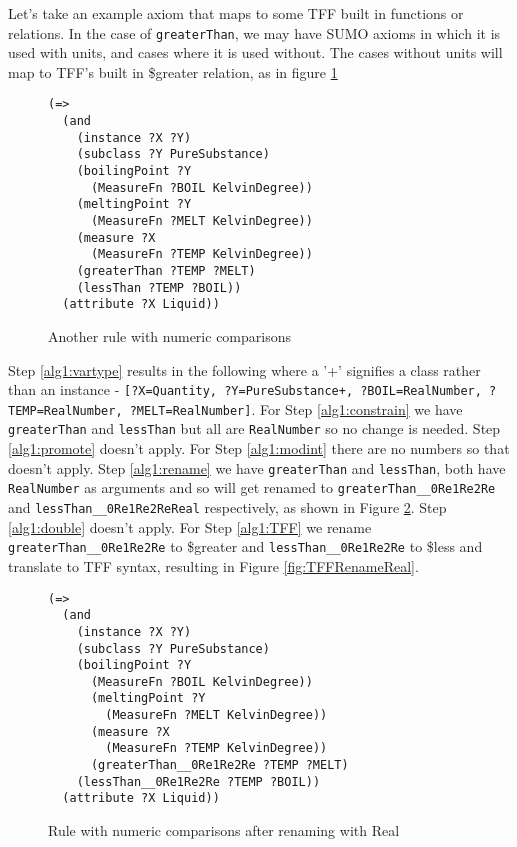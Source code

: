 \documentclass{article}
\begin{document}
Let's take an example axiom that maps to some TFF
built in functions or relations.  In the case of \texttt{greaterThan}, we may
have SUMO axioms in which it is used with units, and cases where it is used
without.  The cases without units will map to TFF's built in \$greater relation,
as in figure \ref{fig:NumCompare}

\begin{figure}[H]
\begin{framed}
\begin{verbatim}
(=>
  (and
    (instance ?X ?Y)
    (subclass ?Y PureSubstance)
    (boilingPoint ?Y
      (MeasureFn ?BOIL KelvinDegree))
    (meltingPoint ?Y
      (MeasureFn ?MELT KelvinDegree))
    (measure ?X
      (MeasureFn ?TEMP KelvinDegree))
    (greaterThan ?TEMP ?MELT)
    (lessThan ?TEMP ?BOIL))
  (attribute ?X Liquid))
\end{verbatim}
\end{framed}
\caption{Another rule with numeric comparisons}
\label{fig:NumCompare}
\end{figure}

\begin{sloppypar} Step \ref{alg1:vartype} results in the following where a '+'
signifies a class rather than an instance - \texttt{[?X=Quantity,
?Y=PureSubstance+, ?BOIL=RealNumber, ?TEMP=RealNumber, ?MELT=RealNumber]}. For
Step \ref{alg1:constrain} we have \texttt{greaterThan} and \texttt{lessThan} but
all are \texttt{RealNumber} so no change is needed. Step \ref{alg1:promote}
doesn't apply. For Step \ref{alg1:modint} there are no numbers so that doesn't
apply.   Step \ref{alg1:rename} we have \texttt{greaterThan} and
\texttt{lessThan}, both have \texttt{RealNumber} as arguments and so will get
renamed to \texttt{greaterThan\_\_0Re1Re2Re} and \texttt{lessThan\_\_0Re1Re2ReReal} respectively,
as shown in Figure \ref{fig:RenameReal}. Step \ref{alg1:double} doesn't apply.
For Step \ref{alg1:TFF} we rename \texttt{greaterThan\_\_0Re1Re2Re} to \$greater and
\texttt{lessThan\_\_0Re1Re2Re} to \$less and translate to TFF syntax, resulting in
Figure \ref{fig:TFFRenameReal}. \end{sloppypar}

\begin{figure}[H]
\begin{framed}
\begin{verbatim}
(=>
  (and
    (instance ?X ?Y)
    (subclass ?Y PureSubstance)
    (boilingPoint ?Y
      (MeasureFn ?BOIL KelvinDegree))
      (meltingPoint ?Y
        (MeasureFn ?MELT KelvinDegree))
      (measure ?X
        (MeasureFn ?TEMP KelvinDegree))
      (greaterThan__0Re1Re2Re ?TEMP ?MELT)
    (lessThan__0Re1Re2Re ?TEMP ?BOIL))
  (attribute ?X Liquid))
\end{verbatim}
\end{framed}
\caption{Rule with numeric comparisons after renaming with Real}
\label{fig:RenameReal}
\end{figure}
\end{document}
